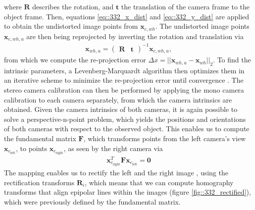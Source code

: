 where $\bm{R}$ describes the rotation, and $\bm{t}$ the translation of the camera frame to the object frame. Then, equations \ref{eq::332_x_dist} and \ref{eq::332_y_dist} are applied to obtain the undistorted image points from $\bm{x}_{c,wh}$. The undistorted image points $\bm{x}_{c,wh,u}$ are then being reprojected by inverting the rotation and translation via
\begin{align}
	\bm{x}_{wh,u} = \begin{pmatrix}
	\bm{R} & \bm{t}
	\end{pmatrix}^{-1}\bm{x}_{c,wh,u},
	\label{eq::332_reprojection}
\end{align}
from which we compute the re-projection error $\Delta x = ||\bm{x}_{wh,u} - \bm{x}_{wh}||_2$. To find the intrinsic parameters, a Levenberg-Marquardt algorithm then optimizes them in an iterative scheme to minimize the re-projection error until convergence \cite{zhang2000flexible}. The stereo camera calibration can then be performed by applying the mono camera calibration to each camera separately, from which the camera intrinsics are obtained. Given the camera intrinsics of both cameras, it is again possible to solve a perspective-n-point problem, which yields the positions and orientations of both cameras with respect to the observed object. This enables us to compute the fundamental matrix $\bm{F}$, which transforms points from the left camera's view $\bm{x}_{c_\text{left}}$, to points $\bm{x}_{c_\text{right}}$, as seen by the right camera via
\begin{align}
	\bm{x}_{c_\text{right}}^T\bm{F}\bm{x}_{c_\text{left}} = \bm{0}
\end{align}
The mapping enables us to rectify the left and the right image \cite{loop1999computing}, using the rectification transforms $\bm{R}_i$, which means that we can compute homography transforms that align epipolar lines within the images (figure \ref{fig::332_rectified}), which were previously defined by the fundamental matrix. 
